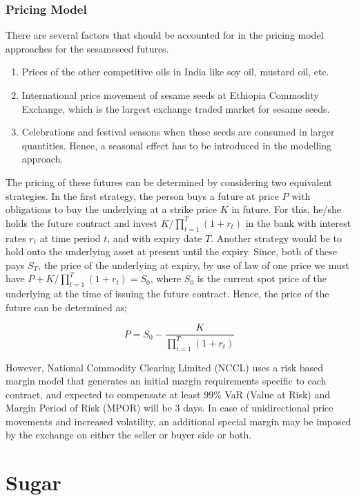 \documentclass[12pt]{report}
\begin{document}
\section{Pricing Model}
\label{sec:price-sesame}

There are several factors that should be accounted for in the pricing model approaches for the sesameseed futures.

\begin{enumerate}
    \item Prices of the other competitive oils in India like soy oil, mustard oil, etc.
    \item International price movement of sesame seeds at Ethiopia Commodity Exchange, which is the largest exchange traded market for sesame seeds.
    \item Celebrations and festival seasons when these seeds are consumed in larger quantities. Hence, a seasonal effect has to be introduced in the modelling approach.
\end{enumerate}


The pricing of these futures can be determined by considering two equivalent strategies. In the first strategy, the person buys a future at price $P$ with obligations to buy the underlying at a strike price $K$ in future. For this, he/she holds the future contract and invest $K/\prod_{t = 1}^T (1 + r_t)$ in the bank with interest rates $r_t$ at time period $t$, and with expiry date $T$. Another strategy would be to hold onto the underlying asset at present until the expiry. Since, both of these pays $S_T$, the price of the underlying at expiry, by use of law of one price we must have $P + K/\prod_{t = 1}^T (1 + r_t) = S_0$, where $S_0$ is the current spot price of the underlying at the time of issuing the future contract. Hence, the price of the future can be determined as;

$$
P = S_0 - \frac{K}{\prod_{t = 1}^T (1 + r_t)}
$$

However, National Commodity Clearing Limited (NCCL) uses a risk based margin model that generates an initial margin requirements specific to each contract, and expected to compensate at least $99\%$ VaR (Value at Risk) and Margin Period of Risk (MPOR) will be $3$ days. In case of unidirectional price movements and increased volatility, an additional special margin may be imposed by the exchange on either the seller or buyer side or both.




\part{Sugar}
\setcounter{chapter}{2}
\setcounter{section}{0}
\end{document}
